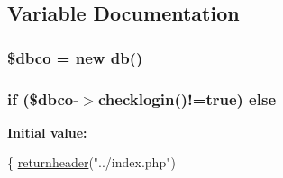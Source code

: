 \subsection{Variable Documentation}
\hypertarget{login_8php_a2998f304f663e07feaa31e5df9d715dc}{
\subsubsection[{\$dbco}]{\setlength{\rightskip}{0pt plus 5cm}\$dbco = new {\bf db}()}}\label{login_8php_a2998f304f663e07feaa31e5df9d715dc}
\hypertarget{login_8php_a0da35c754a10b2ea574c4cc3d8e7c571}{
\subsubsection[{else}]{\setlength{\rightskip}{0pt plus 5cm}if (\$dbco-\/$>$checklogin()!=true) else}}\label{login_8php_a0da35c754a10b2ea574c4cc3d8e7c571}
{\bfseries Initial value\-:}
\begin{DoxyCode}
\{
    \hyperlink{index_8php_a52e9df52ecc405f219dd947bf4aab4bc}{returnheader}(\textcolor{stringliteral}{"../index.php"})
\end{DoxyCode}
